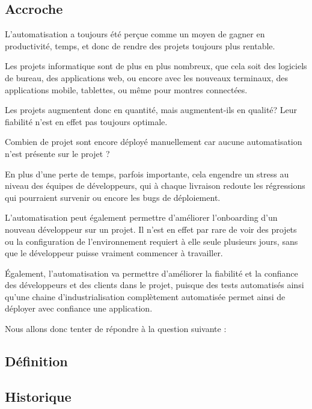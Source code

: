 

\subsection{Accroche}
L'automatisation a toujours été perçue comme un moyen de gagner en productivité, temps, et donc de rendre des projets toujours plus rentable.
	
Les projets informatique sont de plus en plus nombreux, que cela soit des logiciels de bureau, des applications web, ou encore avec les nouveaux terminaux, des applications mobile, tablettes, ou même pour montres connectées.
	
Les projets augmentent donc en quantité, mais augmentent-ils en qualité? Leur fiabilité n'est en effet pas toujours optimale. 
	
Combien de projet sont encore déployé manuellement car aucune automatisation n'est présente sur le projet ? 
	
En plus d'une perte de temps, parfois importante, cela engendre un stress au niveau des équipes de développeurs, qui à chaque livraison redoute les régressions qui pourraient survenir ou encore les bugs de déploiement.

L'automatisation peut également permettre d'améliorer l'onboarding d'un nouveau développeur sur un projet. Il n'est en effet par rare de voir des projets ou la configuration de l'environnement requiert à elle seule plusieurs jours, sans que le développeur puisse vraiment commencer à travailler.
	
Également, l'automatisation va permettre d'améliorer la fiabilité et la confiance des développeurs et des clients dans le projet, puisque des tests automatisés ainsi qu'une chaine d'industrialisation complètement automatisée permet ainsi de déployer avec confiance une application.
	
Nous allons donc tenter de répondre à la question suivante : 
	
{\LARGE \problematique}

\subsection{Définition}

\subsection{Historique}

